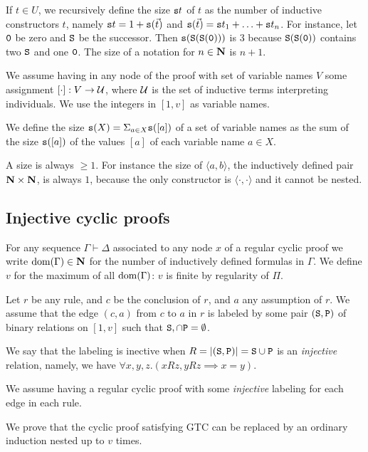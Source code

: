 \documentclass{lmcs}
\begin{document}
If $t \in U$, we recursively define the size ${\tt s}{t}$ of $t$ as the number of inductive 
constructors $t$, namely ${\tt s}{t} = 1 + {\tt s}(\vec{t})$ and 
${\tt s}(\vec{t}) = {\tt s}{t_1} + \ldots + {\tt s}{t_n}$. 
For instance, let $\tt 0$ be zero and $\tt S$ be the successor. 
Then $\tt {\tt s}(S(S(0)))$ is $3$
because $\tt S(S(0))$ contains two $\tt S$ and one $\tt 0$. 
The size of a notation for $n \in {\bf N}$ is $n+1$.

We assume having in any node of the proof with set of variable names $V$
some assignment $[\cdot]:V \rightarrow {\mathcal U}$, where ${\mathcal U}$ is the set of inductive
terms interpreting individuals. We use the integers in $[1,v]$ as variable names.

We define the size ${\tt s}(X) = \Sigma_{a \in X}{\tt s}([a]) $ 
of a set of variable names as the sum of the size ${\tt s}([a])$
of the values $[a]$ of each variable name $a \in X$. 

A size is always $\ge 1$. For instance the size of $\langle a, b \rangle$,
 the inductively defined pair ${\bf N} \times {\bf N}$,
is always $1$, because the only constructor is $\langle \cdot, \cdot \rangle$
and it cannot be nested.

\subsection{Injective cyclic proofs}
For any sequence $\Gamma \vdash \Delta$ associated to any node $x$ of a 
regular cyclic proof
we write ${\rm dom}(\Gamma) \in {\bf N}$ for the number of inductively defined formulas in $\Gamma$.
We define $v$ for the maximum of all ${\rm dom}(\Gamma)$: 
$v$ is finite by regularity of $\Pi$.

Let $r$ be any rule, and $c$ be the conclusion of $r$, and $a$ any assumption of
$r$. We assume that the edge $(c,a)$ from $c$ to $a$ in $r$ is labeled by some 
pair $({\tt S},{\tt P})$ of binary relations on $[1,v]$ such that ${\tt S}, \cap {\tt P} = \emptyset$.

We say that the labeling is inective when $R = {| ({\tt S},{\tt P}) |} =
{\tt S} \cup {\tt P}$ is an \emph{injective} relation, namely, 
we have $\forall x,y,z. (xRz, yRz \implies x=y)$.

We assume having a regular cyclic proof with some \emph{injective}
labeling for each edge in each rule. 

We prove that the cyclic proof satisfying GTC
can be replaced by an ordinary induction nested up to $v$ times.
\end{document}
